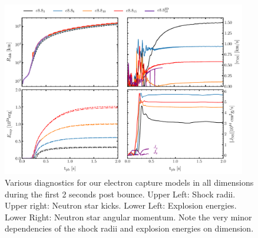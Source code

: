 \documentclass[fleqn,usenatbib]{mnras}
\begin{document}
\begin{figure}
 \centering
 \includegraphics[width=0.95\textwidth]{pic/eexp_kick_all_1d2d3d.pdf}
 \caption{Various diagnostics for our electron capture models in all dimensions during the first 2 seconds post bounce. Upper Left: Shock radii. Upper right: Neutron star kicks. Lower Left: Explosion energies. Lower Right: Neutron star angular momentum. Note the very minor dependencies of the shock radii and explosion energies on dimension. }
 \label{fig:e8pzkick}
\end{figure}
\end{document}
